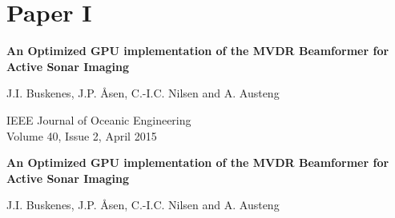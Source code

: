 
\endofdump



\ifRootBuild\else
  
  \makeglossaries
  
  
\fi





\graphicspath{{../HowtoHowtoCapon/submission/final/}}


\cleardoublepage
\pagestyle{empty}

{
\setlength\parskip{\baselineskip}
\renewcommand\baselinestretch{1.1}

\chapter{Paper I}\label{ch:paperI}

{\Large\bf An Optimized GPU implementation of the MVDR Beamformer for Active Sonar Imaging}

J.I. Buskenes, J.P. Åsen, C.-I.C. Nilsen and A. Austeng

IEEE Journal of Oceanic Engineering\\
Volume 40, Issue 2, April 2015%
}


\cleardoublepage
\pagestyle{normal}
\thispagestyle{plain}

\begin{center}
{\Large\bf An Optimized GPU implementation of the MVDR Beamformer for Active Sonar Imaging}

\vspace{\baselineskip}
J.I. Buskenes, J.P. Åsen, C.-I.C. Nilsen and A. Austeng
\end{center}

\overfullrule=1mm
{

   
}
   
% 
% 
%    


